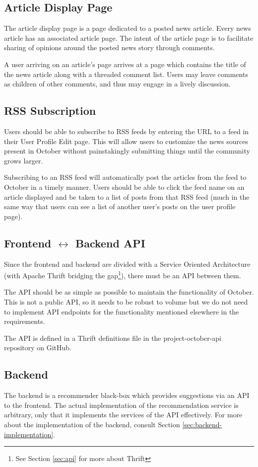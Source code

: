 \documentclass[11pt,letterpaper,titlepage]{article}
\begin{document}
\subsection{Article Display Page}
The article display page is a page dedicated to a posted news article. Every news article has an associated article page.
The intent of the article page is to facilitate sharing of opinions around the posted news story through comments.

A user arriving on an article's page arrives at a page which contains the title of the news article along with a threaded comment list.
Users may leave comments as children of other comments, and thus may engage in a lively discussion.

\subsection{RSS Subscription}
\label{sec:rssrequirements}
Users should be able to subscribe to RSS feeds by entering the URL to a feed in their User Profile Edit page.
This will allow users to customize the news sources present in October without painstakingly submitting things until the community grows larger.

Subscribing to an RSS feed will automatically post the articles from the feed to October in a timely manner.
Users should be able to click the feed name on an article displayed and be taken to a list of posts from that RSS feed (much in the same way that users can see a list of another user's posts on the user profile page).

\subsection{Frontend $\leftrightarrow$ Backend API}
Since the frontend and backend are divided with a Service Oriented Architecture (with Apache Thrift bridging the gap\footnote{See Section \ref{sec:api} for more about Thrift}), there must be an API between them.

The API should be as simple as possible to maintain the functionality of October. This is not a public API, so it needs to be robust to volume but we do not need to implement API endpoints for the functionality mentioned elsewhere in the requirements.

The API is defined in a Thrift definitions file in the project-october-api repository on GitHub\cite{project-october-api}.

\subsection{Backend} %
The backend is a recommender black-box which provides suggestions via an API to the frontend.
The actual implementation of the recommendation service is arbitrary, only that it implements the services of the API effectively.
For more about the implementation of the backend, consult Section \ref{sec:backend-implementation}.
\end{document}

